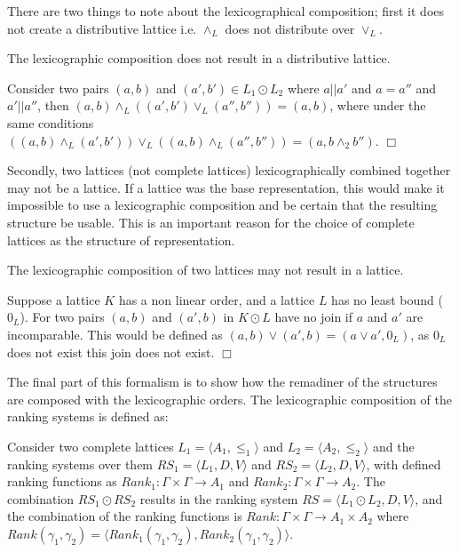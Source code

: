 There are two things to note about the lexicographical composition; 
first it does not create a distributive lattice i.e. $\wedge_L$ does not distribute over $\vee_L$.
\begin{prop}
The lexicographic composition does not result in a distributive lattice.
\end{prop}
\begin{prof}
Consider two pairs $(a,b)$ and $(a', b') \in L_1 \odot L_2$ where $a || a'$ and $a = a''$ and $a' || a''$,
then $(a,b) \wedge_{L} ((a', b') \vee_{L} (a'', b'')) = (a,b)$,
where under the same conditions $((a,b) \wedge_{L} (a', b')) \vee_{L} ((a,b) \wedge_{L} (a'', b'')) = (a,b \wedge_2 b'')$.
$\Box$\end{prof}

Secondly, two lattices (not complete lattices) lexicographically combined together may not be a lattice. 
If a lattice was the base representation, this would make it impossible to use a lexicographic composition and be certain that the resulting structure be usable.
This is an important reason for the choice of complete lattices as the structure of representation.
\begin{prop}
The lexicographic composition of two lattices may not result in a lattice.
\end{prop}
\begin{prof}
Suppose a lattice $K$ has a non linear order, and a lattice $L$ has no least bound ($0_L$). 
For two pairs $(a,b)$ and $(a',b)$ in $K \odot L$ have no join if $a$ and $a'$ are incomparable.
This would be defined as $(a,b) \vee (a',b) = (a \vee a',0_L)$, as $0_L$ does not exist this join does not exist.
$\Box$\end{prof}

The final part of this formalism is to show how the remadiner of the structures are composed with the lexicographic orders.
The lexicographic composition of the ranking systems is defined as:
\begin{defs}
Consider two complete lattices $L_1 = \langle A_1, \leq_1 \rangle$ and $L_2 = \langle A_2,\leq_2 \rangle$ and
the ranking systems over them $RS_1 = \langle L_1,D,V \rangle $ and $RS_2 = \langle L_2,D,V \rangle$,
with defined ranking functions as $Rank_1: \Gamma \times \Gamma \rightarrow A_1 $ and $Rank_2: \Gamma \times \Gamma \rightarrow A_2$.
The combination $RS_1 \odot RS_2$  results in the ranking system 
$RS = \langle L_1 \odot L_2, D, V \rangle$, 
and the combination of the ranking functions is 
$Rank: \Gamma \times \Gamma \rightarrow A_1 \times A_2$ where $Rank(\gamma_1,\gamma_2) = \langle Rank_1(\gamma_1,\gamma_2), Rank_2(\gamma_1,\gamma_2) \rangle$.
\end{defs}

